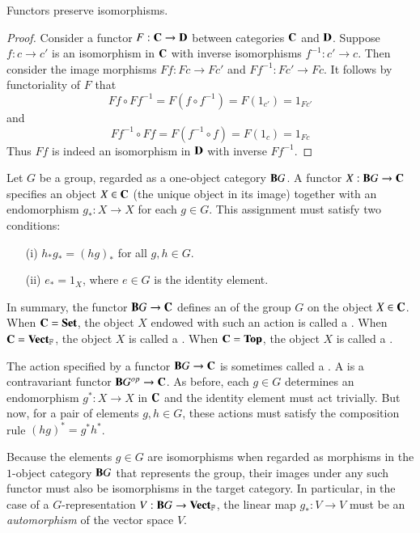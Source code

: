 \documentclass[12pt, a4paper, oneside, openright, titlepage]{book}
\begin{document}
\begin{lem}
    Functors preserve isomorphisms.
\end{lem}
\begin{proof}
    Consider a functor $F:\normalfont\textbf{C}\rightarrow \normalfont\textbf{D}$ between categories $\normalfont\textbf{C}$ and $\normalfont\textbf{D}$. Suppose $f:c\rightarrow c'$ is an isomorphism in $\normalfont\textbf{C}$ with inverse isomorphisms $f^{-1}:c'\rightarrow c$. Then consider the image morphisms $Ff:Fc\rightarrow Fc'$ and $Ff^{-1}:Fc'\rightarrow Fc$. It follows by functoriality of $F$ that \begin{equation*}
        Ff\circ Ff^{-1} = F(f\circ f^{-1}) = F(1_{c'}) = 1_{Fc'}
    \end{equation*}
    and \begin{equation*}
        Ff^{-1}\circ Ff = F(f^{-1}\circ f) = F(1_c) = 1_{Fc}
    \end{equation*}
    Thus $Ff$ is indeed an isomorphism in $\normalfont\textbf{D}$ with inverse $Ff^{-1}$.
\end{proof}


\begin{eg}
    Let $G$ be a group, regarded as a one-object category $\normalfont\textbf{B}G$. A functor $X:\normalfont\textbf{B}G\rightarrow \normalfont\textbf{C}$ specifies an object $X \in \normalfont\textbf{C}$ (the unique object in its image) together with an endomorphism $g_*:X\rightarrow X$ for each $g \in G$. This assignment must satisfy two conditions: \begin{enumerate}
        \item[(i)] $h_*g_* = (hg)_*$ for all $g,h \in G$.
        \item[(ii)] $e_* = 1_X$, where $e \in G$ is the identity element.
    \end{enumerate}
    In summary, the functor $\normalfont\textbf{B}G\rightarrow \normalfont\textbf{C}$ defines an  of the group $G$ on the object $X \in \normalfont\textbf{C}$. When $\normalfont\textbf{C} = \normalfont\textbf{Set}$, the object $X$ endowed with such an action is called a . When $\normalfont\textbf{C} = \normalfont\textbf{Vect}_{\mathbb{F}}$, the object $X$ is called a . When $\normalfont\textbf{C} = \normalfont\textbf{Top}$, the object $X$ is called a . 

    The action specified by a functor $\normalfont\textbf{B}G\rightarrow \normalfont\textbf{C}$ is sometimes called a . A  is a contravariant functor $\normalfont\textbf{B}G^{op}\rightarrow \normalfont\textbf{C}$. As before, each $g \in G$ determines an endomorphism $g^*:X\rightarrow X$ in $\normalfont\textbf{C}$ and the identity element must act trivially. But now, for a pair of elements $g,h \in G$, these actions must satisfy the composition rule $(hg)^* = g^*h^*$. 


    Because the elements $g \in G$ are isomorphisms when regarded as morphisms in the $1$-object category $\normalfont\textbf{B}G$ that represents the group, their images under any such functor must also be isomorphisms in the target category. In particular, in the case of a $G$-representation $V:\normalfont\textbf{B}G\rightarrow \normalfont\textbf{Vect}_{\mathbb{F}}$, the linear map $g_*:V\rightarrow V$ must be an \emph{automorphism} of the vector space $V$. 
\end{eg}
\end{document}
